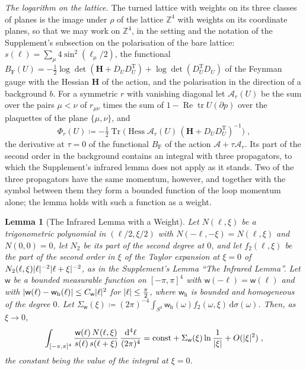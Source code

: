 \documentclass[11pt]{preprint}
\newcommand{\dd}{\mathrm{d}}
\newcommand{\tr}{\operatorname{tr}}
\DeclarePairedDelimiter{\abs}{\lvert}{\rvert}
\numberwithin{equation}{section}
\newtheorem{lemma}[theorem]{Lemma}
\theoremstyle{definition}
\theoremstyle{remark}
\theoremstyle{plain}
\begin{document}
\emph{The logarithm on the lattice.} The turned lattice with weights on its three classes of planes is the image under $\rho$ of the lattice $\mathbb Z^4$ with weights on its coordinate planes, so that we may work on $\mathbb Z^4$, in the setting and the notation of the Supplement's subsection on the polarisation of the bare lattice: $s(\ell) = \sum_\mu4\sin^2(\ell_\mu/2)$, the functional $B_{\mathrm F}(U) = -\frac12\log\det(\mathbf H + D_UD_U^{\mathrm T}) + \log\det(D_U^{\mathrm T}D_U)$ of the Feynman gauge with the Hessian $\mathbf H$ of the action, and the polarisation in the direction of a background $b$. For a symmetric $r$ with vanishing diagonal let $\mathcal A_r(U)$ be the sum over the pairs $\mu < \nu$ of $r_{\mu\nu}$ times the sum of $1 - \operatorname{Re}\tr U(\partial p)$ over the plaquettes of the plane $\{ \mu, \nu \}$, and
\begin{equation}\label{eq:weight-functional}
    \Phi_r(U) \coloneqq -\tfrac12\operatorname{Tr}\bigl(\operatorname{Hess}\mathcal A_r(U)\,(\mathbf H + D_UD_U^{\mathrm T})^{-1}\bigr)\;,
\end{equation}
the derivative at $\tau = 0$ of the functional $B_{\mathrm F}$ of the action $\mathcal A + \tau\mathcal A_r$. Its part of the second order in the background contains an integral with three propagators, to which the Supplement's infrared lemma does not apply as it stands. Two of the three propagators have the same momentum, however, and together with the symbol between them they form a bounded function of the loop momentum alone; the lemma holds with such a function as a weight.

\begin{lemma}[The Infrared Lemma with a Weight]\label{lem:weighted-infrared}
Let $N(\ell, \xi)$ be a trigonometric polynomial in $(\ell/2, \xi/2)$ with $N(-\ell, -\xi) = N(\ell, \xi)$ and $N(0, 0) = 0$, let $N_2$ be its part of the second degree at $0$, and let $f_2(\ell, \xi)$ be the part of the second order in $\xi$ of the Taylor expansion at $\xi = 0$ of $N_2(\ell, \xi)\abs\ell^{-2}\abs{\ell + \xi}^{-2}$, as in the Supplement's Lemma ``The Infrared Lemma''. Let $\mathsf w$ be a bounded measurable function on $[-\pi, \pi]^4$ with $\mathsf w(-\ell) = \mathsf w(\ell)$ and with $\abs{\mathsf w(\ell) - \mathsf w_{\mathrm h}(\ell)} \leq C_{\mathsf w}\abs\ell^2$ for $\abs\ell \leq \frac\pi2$, where $\mathsf w_{\mathrm h}$ is bounded and homogeneous of the degree $0$. Let $\Sigma_{\mathsf w}(\xi) \coloneqq (2\pi)^{-4}\int_{S^3}\mathsf w_{\mathrm h}(\omega)f_2(\omega, \xi)\,\dd\sigma(\omega)$. Then, as $\xi \to 0$,
\begin{equation}\label{eq:weighted-infrared}
    \int_{[-\pi,\pi]^4}\frac{\mathsf w(\ell)\,N(\ell, \xi)}{s(\ell)\,s(\ell + \xi)}\,\frac{\dd^4\ell}{(2\pi)^4} = \mathrm{const} + \Sigma_{\mathsf w}(\xi)\ln\frac{1}{\abs\xi} + O(\abs\xi^2)\;,
\end{equation}
the constant being the value of the integral at $\xi = 0$.
\end{lemma}
\end{document}
